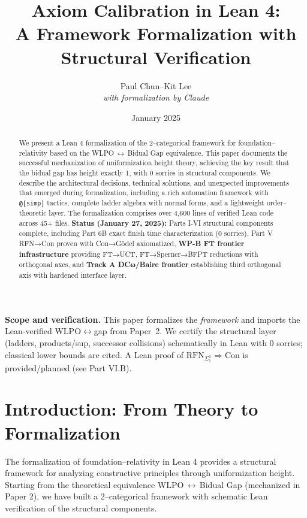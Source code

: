 \documentclass[11pt]{article}
\title{Axiom Calibration in Lean 4:\\
A Framework Formalization with Structural Verification}
\author{Paul Chun--Kit Lee\\
\textit{with formalization by Claude}}
\date{January 2025}
\theoremstyle{definition}
\theoremstyle{remark}
\begin{document}
\maketitle

\begin{abstract}
We present a Lean 4 formalization of the 2--categorical framework for foundation--relativity based on the WLPO\,$\leftrightarrow$\,Bidual Gap equivalence. This paper documents the successful mechanization of uniformization height theory, achieving the key result that the bidual gap has height exactly 1, with 0 sorries in structural components. We describe the architectural decisions, technical solutions, and unexpected improvements that emerged during formalization, including a rich automation framework with \texttt{@[simp]} tactics, complete ladder algebra with normal forms, and a lightweight order--theoretic layer. The formalization comprises over 4,600 lines of verified Lean code across 45+ files. \textbf{Status (January 27, 2025):} Parts I-VI structural components complete, including Part 6B exact finish time characterization (0 sorries), Part V RFN→Con proven with Con→Gödel axiomatized, \textbf{WP-B FT frontier infrastructure} providing FT→UCT, FT→Sperner→BFPT reductions with orthogonal axes, and \textbf{Track A DCω/Baire frontier} establishing third orthogonal axis with hardened interface layer.
\end{abstract}

\begin{mdframed}[style=status]
\textbf{Scope and verification.} 
This paper formalizes the \emph{framework} and imports the Lean-verified WLPO$\leftrightarrow$gap from Paper~2. 
We certify the structural layer (ladders, products/sup, successor collisions) schematically in Lean with 0 sorries; 
classical lower bounds are cited. A Lean proof of $\mathrm{RFN}_{\Sigma^0_1}\Rightarrow\mathrm{Con}$ is provided/planned (see Part VI.B).
\end{mdframed}

\tableofcontents

\section{Introduction: From Theory to Formalization}

The formalization of foundation--relativity in Lean 4 provides a structural framework for analyzing constructive principles through uniformization height. Starting from the theoretical equivalence WLPO\,$\leftrightarrow$\,Bidual Gap (mechanized in Paper 2), we have built a 2--categorical framework with schematic Lean verification of the structural components.
\end{document}
